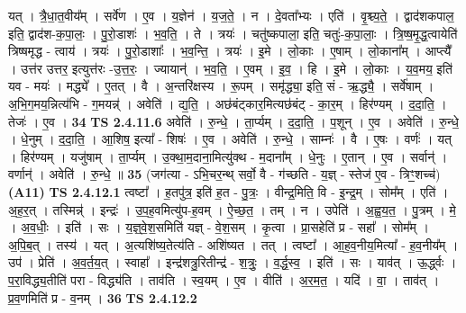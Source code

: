 \documentclass[17pt]{extarticle}
\begin{document}
                  यत् । त्रै॒धा॒त॒वीय᳚म् । सर्वे॑ण । ए॒व । य॒ज्ञेन॑ । य॒ज॒ते॒ । न । दे॒वता᳚भ्यः । एति॑ । वृ॒श्च्य॒ते॒ । द्वाद॑शकपाल॒ इति॒ द्वाद॑श-क॒पा॒लः॒ । पु॒रो॒डाशः॑ । भ॒व॒ति॒ । ते । त्रयः॑ । चतु॑ष्कपाला॒ इति॒ चतुः॑-क॒पा॒लाः॒ । त्रि॒ष्ष॒मृ॒द्ध॒त्वायेति॑ त्रिष्षमृद्ध - त्वाय॑ । त्रयः॑ । पु॒रो॒डाशाः᳚ । भ॒व॒न्ति॒ ।   त्रयः॑ । इ॒मे । लो॒काः । ए॒षाम् । लो॒काना᳚म् ।  आप्त्यै᳚ । उत्त॑र उत्तर॒ इत्युत्त॑रः -उ॒त्त॒रः॒ ।  ज्यायान्॑ । भ॒व॒ति॒ । ए॒वम् । इ॒व॒ । हि । इ॒मे । लो॒काः । य॒व॒मय॒ इति॑ यव - मयः॑ । मद्ध्ये᳚ । ए॒तत् ।   वै । अ॒न्तरि॑क्षस्य । रू॒पम् । समृ॑द्ध्या॒ इति॒ सं - ऋ॒द्ध्यै॒ । सर्वे॑षाम् । अ॒भि॒ग॒मय॒न्नित्य॑भि - ग॒मयन्न्॑ । अवेति॑ । द्य॒ति॒ । अछ॑बंट्कार॒मित्यछ॑बंट् - का॒र॒म् । हिर॑ण्यम् । द॒दा॒ति॒ । तेजः॑ । ए॒व । \textbf{  34} \newline
                  \newline
                                \textbf{ TS 2.4.11.6} \newline
                  अवेति॑ । रु॒न्धे॒ । ता॒र्प्यम् । द॒दा॒ति॒ । प॒शून् । ए॒व । अवेति॑ । रु॒न्धे॒ । धे॒नुम् । द॒दा॒ति॒ । आ॒शिष॒ इत्या᳚ - शिषः॑ । ए॒व । अवेति॑ । रु॒न्धे॒ । साम्नः॑ । वै । ए॒षः । वर्णः॑ । यत् । हिर॑ण्यम् । यजु॑षाम् । ता॒र्प्यम् । उ॒क्था॒म॒दाना॒मित्यु॑क्थ - म॒दाना᳚म् । धे॒नुः । ए॒तान् । ए॒व । सर्वान्॑ । वर्णान्॑ । अवेति॑ । रु॒न्धे॒ ॥ \textbf{  35 } \newline
                  \newline
                      (जग॑त्या - ऽभि॒चर॒न्थ् सर्वो॒ वै - ग॑च्छति - य॒ज्ञ् - स्तेज॑ ए॒व - त्रिꣳ॒॒शच्च॑)  \textbf{(A11)} \newline \newline
                                \textbf{ TS 2.4.12.1} \newline
                  त्वष्टा᳚ । ह॒तपु॑त्र॒ इति॑ ह॒त - पु॒त्रः॒ । वीन्द्र॒मिति॒ वि - इ॒न्द्र॒म् । सोम᳚म् । एति॑ । अ॒ह॒र॒त् । तस्मिन्न्॑ । इन्द्रः॑ । उ॒प॒ह॒वमित्यु॑प-ह॒वम् । ऐ॒च्छ॒त॒ । तम् । न । उपेति॑ । अ॒ह्व॒य॒त॒ । पु॒त्रम् । मे॒ । अ॒व॒धीः॒ । इति॑ । सः । य॒ज्ञ्॒वे॒श॒समिति॑ यज्ञ् - वे॒श॒सम् । कृ॒त्वा । प्रा॒सहेति॑ प्र - सहा᳚ । सोम᳚म् । अ॒पि॒ब॒त् । तस्य॑ । यत् । अ॒त्यशि॑ष्य॒तेत्य॑ति - अशि॑ष्यत । तत् । त्वष्टा᳚ । आ॒ह॒व॒नीय॒मित्या᳚ - ह॒व॒नीय᳚म् । उप॑ । प्रेति॑ । अ॒व॒र्त॒य॒त् । स्वाहा᳚ । इन्द्र॑शत्रु॒रितीन्द्र॑ -  श॒त्रुः॒ । व॒र्द्ध॒स्व॒ । इति॑ । सः । याव॑त् । ऊ॒र्द्ध्वः । प॒रा॒विद्ध्य॒तीति॑ परा - विद्ध्य॑ति । ताव॑ति । स्व॒यम् । ए॒व । वीति॑ । अ॒र॒म॒त॒ । यदि॑ । वा॒ । ताव॑त् । प्र॒व॒णमिति॑ प्र - व॒नम् । \textbf{  36} \newline
                  \newline
                                \textbf{ TS 2.4.12.2} \newline
\end{document}
